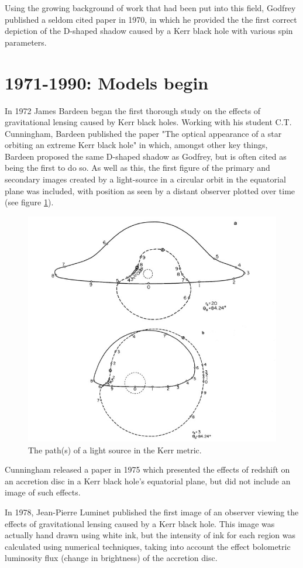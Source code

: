 \documentclass[oneside,openright,frontopenright, singlespacing]{dmathesis}
\begin{document}
\vspace{1em}
	Using the growing background of work that had been put into this field, Godfrey published a seldom cited paper in 1970, in which he provided the the first correct depiction of the D-shaped shadow caused by a Kerr black hole with various spin parameters\cite{godfrey1970mach}.

\section{1971-1990: Models begin}\label{sec:Section1.2}

	In 1972 James Bardeen began the first thorough study on the effects of gravitational lensing caused by Kerr black holes\cite{bardeen1973timelike}. Working with his student C.T. Cunningham, Bardeen published the paper "The optical appearance of a star orbiting an extreme Kerr black hole"\cite{cunningham1973optical} in which, amongst other key things, Bardeen proposed the same D-shaped shadow as Godfrey, but is often cited as being the first to do so. As well as this, the first figure of the primary and secondary images created by a light-source in a circular orbit in the equatorial plane was included, with position as seen by a distant observer plotted over time (see figure \ref{fig:Figure1.1}).

\begin{figure}[!ht]
	\centering
	\includegraphics[width=0.4\linewidth]{img/Cunningham-Bardeen-1973-2images-2}
	\caption{The path(s) of a light source in the Kerr metric. \cite{cunningham1973optical}}
	\label{fig:Figure1.1}
\end{figure}

\vspace{1em}
	Cunningham released a paper in 1975 which presented the effects of redshift on an accretion disc in a Kerr black hole's equatorial plane\cite{cunningham1975effects}, but did not include an image of such effects.

\vspace{1em}
	In 1978, Jean-Pierre Luminet published the first image of an observer viewing the effects of gravitational lensing caused by a Kerr black hole\cite{luminet1979image}. This image was actually hand drawn using white ink, but the intensity of ink for each region was calculated using numerical techniques, taking into account the effect bolometric luminosity flux (change in brightness) of the accretion disc.
\end{document}
